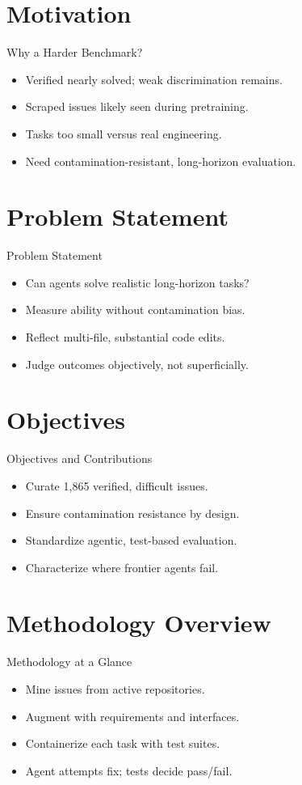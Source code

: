 \documentclass{beamer}
\begin{document}
\section{Motivation}
\begin{frame}{Why a Harder Benchmark?}
\begin{itemize}
\item Verified nearly solved; weak discrimination remains.
\item Scraped issues likely seen during pretraining.
\item Tasks too small versus real engineering.
\item Need contamination-resistant, long-horizon evaluation.
\end{itemize}
\end{frame}

\section{Problem Statement}
\begin{frame}{Problem Statement}
\begin{itemize}
\item Can agents solve realistic long-horizon tasks?
\item Measure ability without contamination bias.
\item Reflect multi-file, substantial code edits.
\item Judge outcomes objectively, not superficially.
\end{itemize}
\end{frame}

\section{Objectives}
\begin{frame}{Objectives and Contributions}
\begin{itemize}
\item Curate 1,865 verified, difficult issues.
\item Ensure contamination resistance by design.
\item Standardize agentic, test-based evaluation.
\item Characterize where frontier agents fail.
\end{itemize}
\end{frame}

\section{Methodology Overview}
\begin{frame}{Methodology at a Glance}
\begin{itemize}
\item Mine issues from active repositories.
\item Augment with requirements and interfaces.
\item Containerize each task with test suites.
\item Agent attempts fix; tests decide pass/fail.
\end{itemize}
\end{frame}
\end{document}
